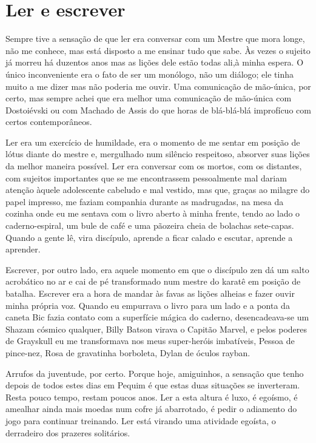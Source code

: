 \chapter{Ler e escrever}

Sempre tive a sensação de que ler era conversar com um Mestre que mora
longe, não me conhece, mas está disposto a me ensinar tudo que sabe.
Às vezes o sujeito já morreu há duzentos anos mas as lições dele
estão todas ali,à minha espera. O único inconveniente era o fato de
ser um monólogo, não um diálogo; ele tinha muito a me dizer mas não
poderia me ouvir. Uma comunicação de mão-única, por certo, mas sempre
achei que era melhor uma comunicação de mão-única com Dostoiévski ou
com Machado de Assis do que horas de blá-blá-blá improfícuo com
certos contemporâneos.

Ler era um exercício de humildade, era o momento de me sentar em
posição de lótus diante do mestre e, mergulhado num silêncio
respeitoso, absorver suas lições da melhor maneira possível. Ler era
conversar com os mortos, com os distantes, com sujeitos importantes
que se me encontrassem pessoalmente mal dariam atenção àquele
adolescente cabeludo e mal vestido, mas que, graças ao milagre do
papel impresso, me faziam companhia durante as madrugadas, na mesa da
cozinha onde eu me sentava com o livro aberto à minha frente, tendo
ao lado o caderno-espiral, um bule de café e uma pãozeira cheia de
bolachas sete-capas. Quando a gente lê, vira discípulo, aprende a
ficar calado e escutar, aprende a aprender.

Escrever, por outro lado, era aquele momento em que o discípulo zen dá
um salto acrobático no ar e cai de pé transformado num mestre do
karatê em posição de batalha.  Escrever era a hora de mandar às favas
as lições alheias e fazer ouvir minha própria voz. Quando eu
empurrava o livro para um lado e a ponta da caneta Bic fazia contato
com a superfície mágica do caderno, desencadeava-se um Shazam cósmico
qualquer, Billy Batson virava o Capitão Marvel, e pelos poderes de
Grayskull eu me transformava nos meus super-heróis imbatíveis, Pessoa
de pince-nez, Rosa de gravatinha borboleta, Dylan de óculos rayban.

Arrufos da juventude, por certo. Porque hoje, amiguinhos, a sensação
que tenho depois de todos estes dias em Pequim é que estas duas
situações se inverteram. Resta pouco tempo, restam poucos anos. Ler a
esta altura é luxo, é egoísmo, é amealhar ainda mais moedas num cofre
já abarrotado, é pedir o adiamento do jogo para continuar treinando.
Ler está virando uma atividade egoísta, o derradeiro dos prazeres
solitários.

